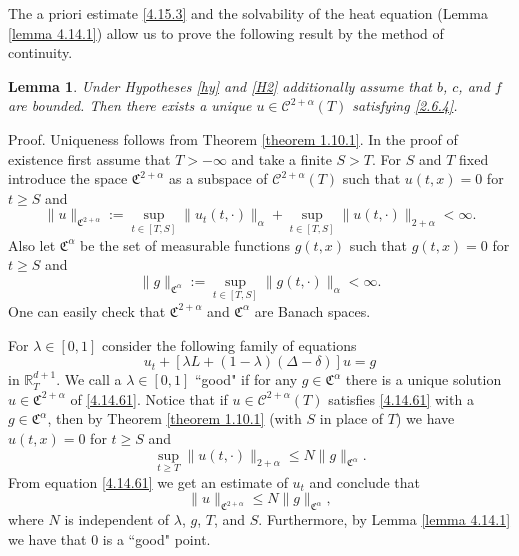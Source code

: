 \documentclass[reqno,12pt]{amsart}
\newtheorem{lemma}[theorem]{Lemma}
\theoremstyle{definition}
\theoremstyle{remark}
\begin{document}
The a priori estimate \eqref{4.15.3} and the solvability of the
heat equation (Lemma \ref{lemma 4.14.1}) allow us to prove the
following result by the method of continuity.

\begin{lemma}
                                                   \label{lemma 4.15.3}
Under Hypotheses \ref{hy} and \ref{H2} additionally assume that
$b$, $c$, and $f$ are bounded. Then there exists a unique
$u\in{\mathcal{C}}^{2+\alpha}(T)$ satisfying \eqref{2.6.4}.
\end{lemma}

Proof. Uniqueness follows from Theorem \ref{theorem 1.10.1}. In
the proof of existence first assume that $T>-\infty$ and take a
finite $S>T$. For $S$ and $T$ fixed introduce the space
${\mathfrak{C}}^{2+\alpha} $ as a subspace of ${\mathcal{C}}^{2+\alpha}(T)$ such that
$u(t,x)=0$ for $t\geq S$ and
$$
\|u\|_{{\mathfrak{C}}^{2+\alpha} }:=\sup_{t\in[T,S]
}\|u_{t}(t,\cdot)\|_{\alpha} +\sup_{t\in[T,S] }\|u
(t,\cdot)\|_{2+\alpha}<\infty.
$$
Also let ${\mathfrak{C}}^{\alpha}$ be the set of measurable functions
$g(t,x)$ such that $g(t,x)=0$ for $t\geq S$ and
$$
\|g\|_{{\mathfrak{C}}^{ \alpha} }:=\sup_{t\in[T,S] }\|g(t,\cdot)\|_{\alpha}
<\infty.
$$
One can easily check that ${\mathfrak{C}}^{2+\alpha}$ and ${\mathfrak{C}}^{\alpha}$
are Banach spaces.

For $\lambda\in[0,1]$ consider the following family of equations
\begin{equation}
                                                       \label{4.14.61}
u_{t}+[\lambda L+(1-\lambda)(\Delta -\delta)] u=g
\end{equation}
in ${\mathbb{R}}^{d+1}_{T}$. We call a $\lambda\in[0,1]$ ``good" if for any
$g\in {\mathfrak{C}}^{\alpha}$ there is a unique solution $u
\in{\mathfrak{C}}^{2+\alpha}$ of \eqref{4.14.61}. Notice that if
$u\in{\mathcal{C}}^{2+\alpha}(T)$ satisfies \eqref{4.14.61} with a
$g\in{\mathfrak{C}}^{\alpha}$, then by Theorem \ref{theorem 1.10.1} (with
$S$ in place of $T$) we have $u(t,x)=0$ for $t\geq S$ and
$$
   \sup_{t\ge  T}\|u(t,\cdot)\|_{2+\alpha} \leq N
\|g\|_{{\mathfrak{C}}^{\alpha} }.
$$
  From equation \eqref{4.14.61} we get an estimate of $u_{t}$ and
conclude that
\begin{equation}
                                                       \label{4.14.9}
   \|u\|_{{\mathfrak{C}}^{2+\alpha}}\leq N  \|g\|_{{\mathfrak{C}}^{\alpha}},
\end{equation}
where $N$ is independent of $\lambda$, $g$, $T$, and $S$.
Furthermore, by Lemma \ref{lemma 4.14.1} we have that $0$ is a
``good" point.
\end{document}
